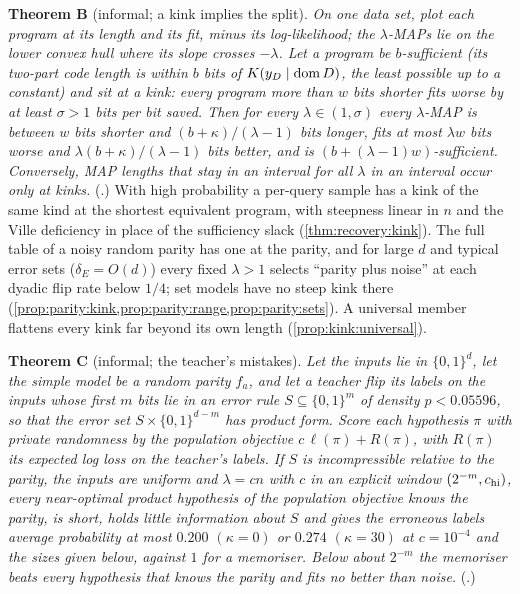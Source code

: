 \smallskip\noindent\textbf{Theorem B} (informal; a kink implies the split). \emph{On one data set, plot each program at its length and its fit, minus its log-likelihood; the $\lambda$-MAPs lie on the lower convex hull where its slope crosses $-\lambda$. Let a program be $b$-sufficient (its two-part code length is within $b$ bits of $K(y_D\mid\operatorname{dom} D)$, the least possible up to a constant) and sit at a kink: every program more than $w$ bits shorter fits worse by at least $\sigma>1$ bits per bit saved. Then for every $\lambda\in(1,\sigma)$ every $\lambda$-MAP is between $w$ bits shorter and $(b+\kappa)/(\lambda-1)$ bits longer, fits at most $\lambda w$ bits worse and $\lambda(b+\kappa)/(\lambda-1)$ bits better, and is $(b+(\lambda-1)w)$-sufficient. Conversely, MAP lengths that stay in an interval for all $\lambda$ in an interval occur only at kinks.} (.) With high probability a per-query sample has a kink of the same kind at the shortest equivalent program, with steepness linear in $n$ and the Ville deficiency in place of the sufficiency slack (\cref{thm:recovery:kink}). The full table of a noisy random parity has one at the parity, and for large $d$ and typical error sets ($\delta_E=O(d)$) every fixed $\lambda>1$ selects ``parity plus noise'' at each dyadic flip rate below $1/4$; set models have no steep kink there (\cref{prop:parity:kink,prop:parity:range,prop:parity:sets}). A universal member flattens every kink far beyond its own length (\cref{prop:kink:universal}).

\smallskip\noindent\textbf{Theorem C} (informal; the teacher's mistakes). \emph{Let the inputs lie in $\{0,1\}^d$, let the simple model be a random parity $f_a$, and let a teacher flip its labels on the inputs whose first $m$ bits lie in an error rule $S\subseteq\{0,1\}^m$ of density $p<0.05596$, so that the error set $S\times\{0,1\}^{d-m}$ has product form. Score each hypothesis $\pi$ with private randomness by the population objective $c\,\ell(\pi)+R(\pi)$, with $R(\pi)$ its expected log loss on the teacher's labels. If $S$ is incompressible relative to the parity, the inputs are uniform and $\lambda=cn$ with $c$ in an explicit window $(2^{-m},c_{\rm hi})$, every near-optimal product hypothesis of the population objective knows the parity, is short, holds little information about $S$ and gives the erroneous labels average probability at most $0.200$ $(\kappa=0)$ or $0.274$ $(\kappa=30)$ at $c=10^{-4}$ and the sizes given below, against $1$ for a memoriser. Below about $2^{-m}$ the memoriser beats every hypothesis that knows the parity and fits no better than noise.} (.)


